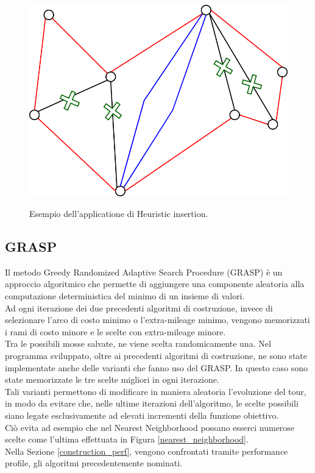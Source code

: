 \vspace{2 cm}
\begin{figure}[h] 
\begin{center} 
  \includegraphics[scale=0.3]{Images/insertion}\\ 
  \caption{\footnotesize{Esempio dell'applicatione di Heuristic insertion.}}
  \label{insertion}
\end{center}
\end{figure}

\subsection{GRASP}
Il metodo Greedy Randomized Adaptive Search Procedure (GRASP) è un approccio algoritmico che permette di aggiungere una componente aleatoria alla computazione deterministica del minimo di un insieme di valori.\\
Ad ogni iterazione dei due precedenti algoritmi di costruzione, invece di selezionare l'arco di costo minimo o l'extra-mileage minimo, vengono memorizzati i rami di costo minore e le scelte con extra-mileage minore.\\
Tra le possibili mosse salvate, ne viene scelta randomicamente una. Nel programma sviluppato, oltre ai precedenti algoritmi di costruzione, ne sono state implementate anche delle varianti che fanno uso del GRASP. In questo caso sono state memorizzate le tre scelte migliori in ogni iterazione.\\
Tali varianti permettono di modificare in maniera aleatoria l'evoluzione del tour, in modo da evitare che, nelle ultime iterazioni dell'algoritmo, le scelte possibili siano legate esclusivamente ad elevati incrementi della funzione obiettivo.\\
Ciò evita ad esempio che nel Nearest Neighborhood possano esserci numerose scelte come l'ultima effettuata in Figura \ref{nearest_neighborhood}.\\
Nella Sezione \ref{construction_perf}, vengono confrontati tramite performance profile, gli algoritmi precedentemente nominati.


